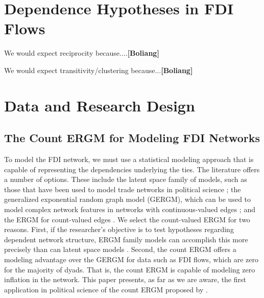 \documentclass{article}
\begin{document}
\section{Dependence Hypotheses in FDI Flows}

We would expect reciprocity because....{\bf [Boliang]}

We would expect transitivity/clustering because...{\bf [Boliang]}


\section{Data and Research Design}

\subsection{The Count ERGM for Modeling FDI Networks}

To model the FDI network, we must use a statistical modeling approach that is capable of representing the dependencies underlying the ties. The literature offers a number of options. These include the latent space family of models, such as those that have been used to model trade networks in political science \citep{ward2007persistent,ward2013gravity}; the generalized exponential random graph model (GERGM), which can be used to model complex network features in networks with continuous-valued edges \citep{desmarais2012statistical,wilson2017stochastic}; and the ERGM for count-valued edges \citep{krivitsky2012exponential}. We select the count-valued ERGM for two reasons. First, if the researcher's objective is to test hypotheses regarding dependent network structure, ERGM family models can accomplish this more precisely than can latent space models \citep{cranmer2016navigating,cranmer2016critique,desmarais2017statistical}. Second, the count ERGM offers a modeling advantage over the GERGM for data such as FDI flows, which are zero for the majority of dyads. That is, the count ERGM is capable of modeling zero inflation in the network. This paper presents, as far as we are aware, the first application in political science of the count ERGM proposed by \cite{krivitsky2012exponential}.
\end{document}
